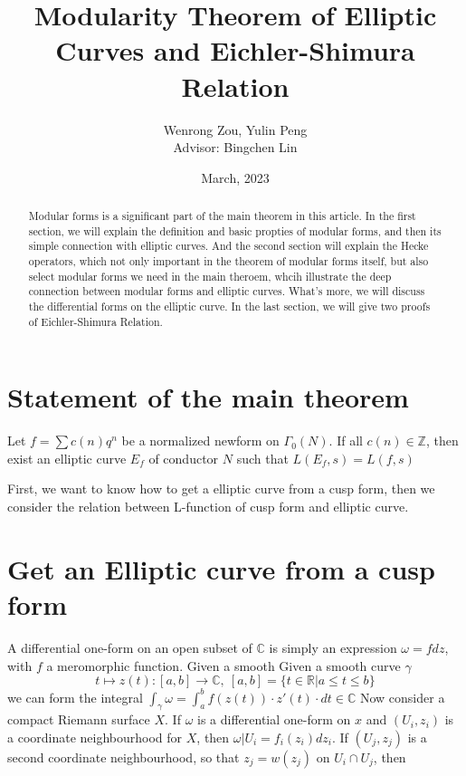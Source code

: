 \documentclass[11pt]{article}
\begin{document}
\title{\bf \huge Modularity Theorem of Elliptic Curves and Eichler-Shimura Relation}
\author{Wenrong Zou, Yulin Peng \\
Advisor: Bingchen Lin
}
\date{March, 2023}
\maketitle
\newpage

\tableofcontents

\begin{abstract}
    Modular forms is a significant part of  the main theorem in this article. In the first section, we will explain 
    the definition and basic propties of modular forms, and then its simple connection with elliptic curves. 
    And the second section will explain the Hecke operators, which not only important in the theorem of modular forms 
    itself, but also select modular forms we need in the main theroem, whcih illustrate the deep connection between 
    modular forms and elliptic curves. What's more, we will discuss the differential forms on the elliptic curve. In 
    the last section, we will give two proofs of Eichler-Shimura Relation. 
\end{abstract}







\section{Statement of the main theorem}
\begin{theorem}
    Let $f=\sum c(n) q^n$ be a normalized newform on $\Gamma_0(N)$. If all $c(n)\in \mathbb{Z}$, then exist an elliptic curve $E_f$
     of conductor $N$ such that $L(E_f,s)=L(f,s)$ 
    
\end{theorem}

First, we want to know how to get a elliptic curve from a cusp form, then we consider the relation between L-function of cusp form 
 and elliptic curve.
\section{Get an Elliptic curve from a cusp form}
A differential one-form on an open subset of $\mathbb{C}$ is simply an expression $\omega =fdz$, with $f$ a meromorphic function. Given a smooth
Given a smooth curve $\gamma $
\begin{equation*}
    t\mapsto z(t):[a,b]\rightarrow \mathbb{C}, \ [a,b]=\{t\in \mathbb{R}| a\leqslant t \leqslant b\}
\end{equation*}
we can form the integral
$\int_{\gamma} \omega =\int_{a}^{b} f(z(t))\cdot z'(t)\cdot dt \in \mathbb{C}$ 
Now consider a compact Riemann surface $X$. If $\omega$ is a differential one-form on $x$ and $(U_i,z_i)$ is a coordinate neighbourhood for $X$, then 
 $\omega |U_i=f_i(z_i)d{z_i}$. If $(U_j,z_j)$ is a second coordinate neighbourhood, so that $z_j=w(z_j)$ on $U_i \cap U_j$, then 
\end{document}
